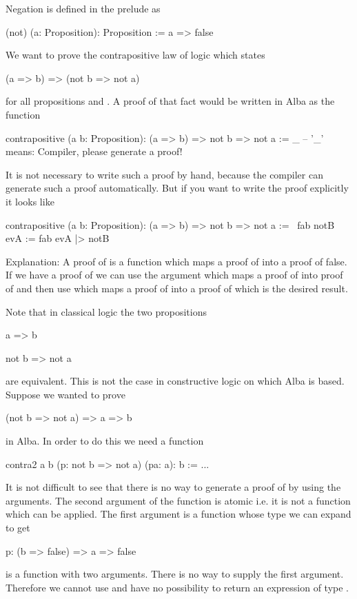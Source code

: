 Negation is defined in the prelude as
\begin{alba}
  (not) (a: Proposition): Proposition :=
    a => false
\end{alba}

We want to prove the contrapositive law of logic which states
\begin{alba}
  (a => b) => (not b => not a)
\end{alba}
for all propositions  and . A proof of that fact would be
written in Alba as the function
%
\begin{alba}
  contrapositive (a b: Proposition): (a => b) => not b => not a
  :=
    _      -- '_' means: Compiler, please generate a proof!
\end{alba}
%
It is not necessary to write such a proof by hand, because the compiler can
generate such a proof automatically. But if you want to write the proof
explicitly it looks like

\begin{alba}
    contrapositive (a b: Proposition): (a => b) => not b => not a
    :=
        \ fab notB evA := fab evA |> notB
\end{alba}

\noindent Explanation: A proof of  is a function which maps a proof
of  into a proof of false. If we have a proof of  we can use the
argument  which maps a proof of  into proof of
 and then use  which maps a proof of  into a proof
of  which is the desired result.



Note that in classical logic the two propositions
\begin{alba}
  a  =>  b

  not b => not a
\end{alba}
%
are equivalent. This is not the case in constructive logic on which Alba is
based. Suppose we wanted to prove
%
\begin{alba}
  (not b => not a) => a => b
\end{alba}
%
in Alba. In order to do this we need a function
\begin{alba}
  contra2 a b (p: not b => not a) (pa: a): b :=
     ...
\end{alba}
%
It is not difficult to see that there is no way to generate a proof of 
by using the arguments. The second argument of the function is atomic i.e. it
is not a function which can be applied. The first argument is a function whose
type we can expand to get
\begin{alba}
  p: (b => false) => a => false
\end{alba}
%
 is a function with two arguments. There is no way to supply the first
argument. Therefore we cannot use  and have no possibility to return
an expression of type .


